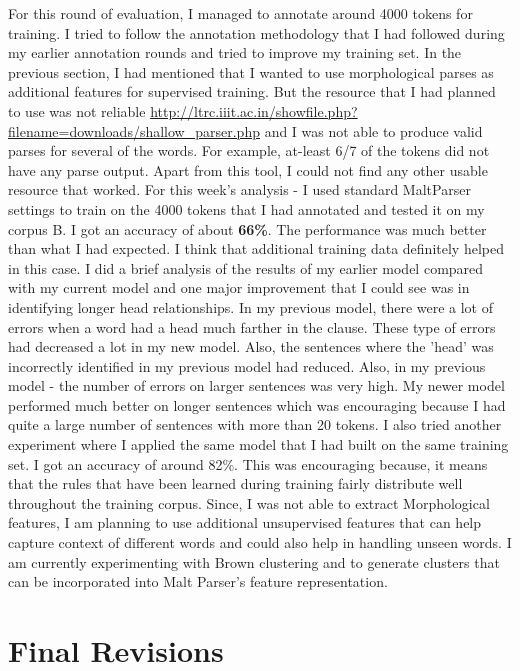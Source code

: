 \documentclass[11pt,letterpaper]{article}
\begin{document}
For this round of evaluation, I managed to annotate around 4000 tokens for training. I tried to follow the annotation methodology that I had followed during 
my earlier annotation rounds and tried to improve my training set. In the previous section, I had mentioned that I wanted to use morphological parses as additional features
for supervised training. But the resource that I had planned to use was not reliable \url{http://ltrc.iiit.ac.in/showfile.php?filename=downloads/shallow_parser.php} and I was not able to produce 
valid parses for several of the words. For example, at-least 6/7 of the tokens did not have any parse output. Apart from this tool, I could not find any other usable resource that worked.
For this week's analysis - I used standard MaltParser settings to train on the 4000 tokens that I had annotated and tested it on my corpus B. I got an
accuracy of about \textbf{66\%}. The performance was much better than what I had expected. I think that additional training data definitely helped in this case. I
did a brief analysis of the results of my earlier model compared with my current model and one major improvement that I could see was in identifying longer head relationships.
In my previous model, there were a lot of errors when a word had a head much farther in the clause. These type of errors had decreased a lot in my new model. 
Also, the sentences where the 'head' was incorrectly identified in my previous model had reduced. Also, in my previous model - the number of errors on larger sentences
was very high. My newer model performed much better on longer sentences which was encouraging because I had quite a large number of sentences with more than 20 tokens.
I also tried another experiment where I applied the same model that I had built on the same training set. I got an accuracy of around 82\%. This was encouraging because, it means that
the rules that have been learned during training fairly distribute well throughout the training corpus. Since, I was not able to extract Morphological features,
I am planning to use additional unsupervised features that can help capture context of different words and could also help in handling unseen words. I am currently
experimenting with Brown clustering and to generate clusters that can be incorporated into Malt Parser's feature representation. 

\section{Final Revisions}
\end{document}
